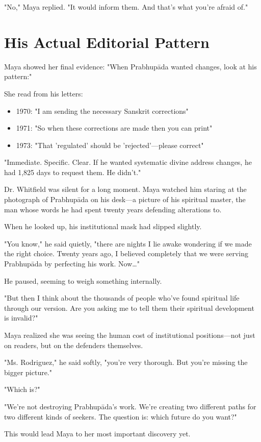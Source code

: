 \documentclass[11pt,twoside]{book}
\begin{document}
"No," Maya replied. "It would inform them. And that's what you're afraid of."
\section*{His Actual Editorial Pattern}
\label{sec:orgc972a29}

Maya showed her final evidence: "When Prabhupāda wanted changes, look at his pattern:"

She read from his letters:
\begin{itemize}
\item 1970: "I am sending the necessary Sanskrit corrections"
\item 1971: "So when these corrections are made then you can print"
\item 1973: "That 'regulated' should be 'rejected'—please correct"
\end{itemize}

"Immediate. Specific. Clear. If he wanted systematic divine address changes, he had 1,825 days to request them. He didn't."

Dr. Whitfield was silent for a long moment. Maya watched him staring at the photograph of Prabhupāda on his desk—a picture of his spiritual master, the man whose words he had spent twenty years defending alterations to.

When he looked up, his institutional mask had slipped slightly. 

"You know," he said quietly, "there are nights I lie awake wondering if we made the right choice. Twenty years ago, I believed completely that we were serving Prabhupāda by perfecting his work. Now\ldots{}"

He paused, seeming to weigh something internally.

"But then I think about the thousands of people who've found spiritual life through our version. Are you asking me to tell them their spiritual development is invalid?"

Maya realized she was seeing the human cost of institutional positions—not just on readers, but on the defenders themselves.

"Ms. Rodriguez," he said softly, "you're very thorough. But you're missing the bigger picture."

"Which is?"

"We're not destroying Prabhupāda's work. We're creating two different paths for two different kinds of seekers. The question is: which future do you want?"

This would lead Maya to her most important discovery yet.
\end{document}
